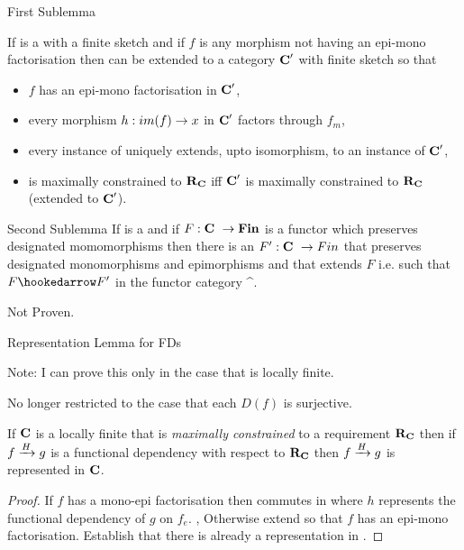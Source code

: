 \begin{frame}{First Sublemma}
\begin{lemma}
If \catcw is a \catMEterm with a finite sketch and if $f$ is any  morphism 
not having an epi-mono factorisation then \catcw can be extended to a category $\catcp$ with finite sketch so that
\begin{itemize} 
\item $f$ has an epi-mono factorisation \factorisationfdiagram in $\catcp$,
\item every morphism $h:im(f) \morph x$ in $\catcp$ factors through $f_m$,
\item every instance of \catcw uniquely extends, upto isomorphism, to an instance of $\catcp$,
\item \catcw is maximally constrained to $\reqtc$ iff $\catcp$ is maximally constrained to $\reqtc$ (extended to $\catcp$).
\end{itemize} 
\end{lemma} 
\end{frame}

\begin{frame}{Second Sublemma}
If \catcw is a \catMEterm and if $F: \catcw \morph \Fin$ is a functor which preserves designated momomorphisms
then there is an $F':\catcw \morph Fin$ that preserves designated monomorphisms and epimorphisms
and that extends $F$ i.e. such that $F \hookedarrow F'$ in the functor category \Fin^{\catc}.

Not Proven.  
\end{frame}

\begin{frame}{Representation Lemma for FDs}
{\small Note: I can prove this only in the case that \catcw is locally finite.

No longer restricted to the case that each $D(f)$ is surjective.}

\begin{lemma}
If $\catc$ is a locally finite \catMEterm that is 
\textit{maximally constrained} to a requirement $\reqtc$ then
if $\fundep{H}{f}{g}$  is a functional dependency with respect to $\reqtc$
then $\fundep{H}{f}{g}$ is represented in $\catc$.
\end{lemma}
\begin{proof} If $f$ has a mono-epi factorisation then
 commutes in \catcw  where $h$ represents 
the functional dependency of $g$ on $f_e$.  ,
Otherwise extend \catcw so that $f$ has an epi-mono factorisation.
Establish that there is already a representation in \catcw.
\end{proof}
\end{frame}

